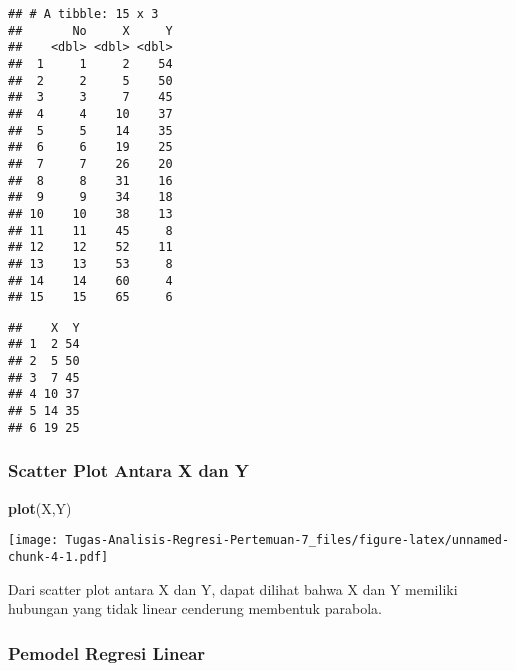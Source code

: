 \documentclass[
]{article}
\newenvironment{Shaded}{\begin{snugshade}}{\end{snugshade}}
\newcommand{\FunctionTok}[1]{\textcolor[rgb]{0.13,0.29,0.53}{\textbf{#1}}}
\newcommand{\NormalTok}[1]{#1}
\newcommand{\OtherTok}[1]{\textcolor[rgb]{0.56,0.35,0.01}{#1}}
\newcommand{\SpecialCharTok}[1]{\textcolor[rgb]{0.81,0.36,0.00}{\textbf{#1}}}
\begin{document}
\begin{verbatim}
## # A tibble: 15 x 3
##       No     X     Y
##    <dbl> <dbl> <dbl>
##  1     1     2    54
##  2     2     5    50
##  3     3     7    45
##  4     4    10    37
##  5     5    14    35
##  6     6    19    25
##  7     7    26    20
##  8     8    31    16
##  9     9    34    18
## 10    10    38    13
## 11    11    45     8
## 12    12    52    11
## 13    13    53     8
## 14    14    60     4
## 15    15    65     6
\end{verbatim}

\begin{Shaded}
\end{Shaded}

\begin{verbatim}
##    X  Y
## 1  2 54
## 2  5 50
## 3  7 45
## 4 10 37
## 5 14 35
## 6 19 25
\end{verbatim}

\hypertarget{scatter-plot-antara-x-dan-y}{%
\subsubsection{Scatter Plot Antara X dan
Y}\label{scatter-plot-antara-x-dan-y}}

\begin{Shaded}
\begin{Highlighting}[]
\FunctionTok{plot}\NormalTok{(X,Y)}
\end{Highlighting}
\end{Shaded}

\texttt{[image: Tugas-Analisis-Regresi-Pertemuan-7\_files/figure-latex/unnamed-chunk-4-1.pdf]}

Dari scatter plot antara X dan Y, dapat dilihat bahwa X dan Y memiliki
hubungan yang tidak linear cenderung membentuk parabola.

\hypertarget{pemodel-regresi-linear}{%
\subsubsection{Pemodel Regresi Linear}\label{pemodel-regresi-linear}}
\end{document}
